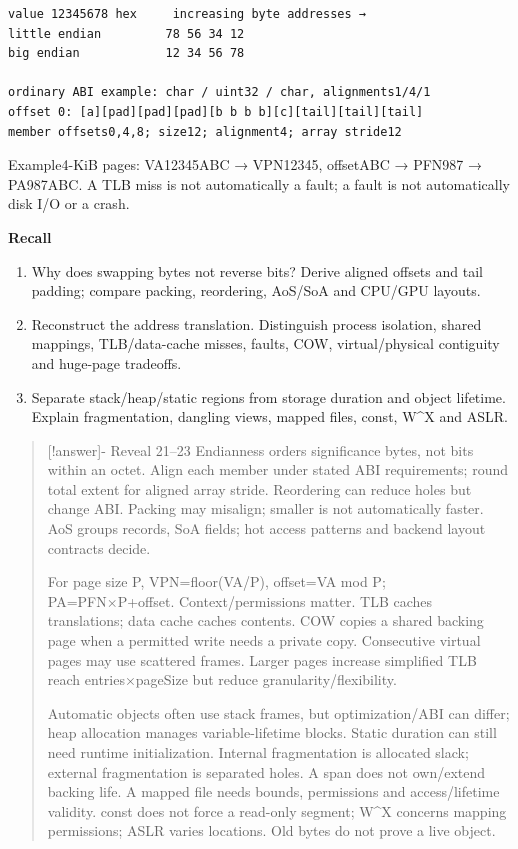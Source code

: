 \begin{verbatim}
value 12345678 hex     increasing byte addresses →
little endian         78 56 34 12
big endian            12 34 56 78

ordinary ABI example: char / uint32 / char, alignments1/4/1
offset 0: [a][pad][pad][pad][b b b b][c][tail][tail][tail]
member offsets0,4,8; size12; alignment4; array stride12
\end{verbatim}


Example4-KiB pages: VA12345ABC → VPN12345, offsetABC → PFN987 → PA987ABC. A TLB miss is not automatically a fault; a fault is not automatically disk I/O or a crash.


\textbf{Recall}

\begin{enumerate}
\def\labelenumi{\arabic{enumi}.}
\setcounter{enumi}{20}
\tightlist
\item
  Why does swapping bytes not reverse bits? Derive aligned offsets and tail padding; compare packing, reordering, AoS/SoA and CPU/GPU layouts.
\item
  Reconstruct the address translation. Distinguish process isolation, shared mappings, TLB/data-cache misses, faults, COW, virtual/physical contiguity and huge-page tradeoffs.
\item
  Separate stack/heap/static regions from storage duration and object lifetime. Explain fragmentation, dangling views, mapped files, const, W\^{}X and ASLR.
\end{enumerate}

\begin{quote}
{[}!answer{]}- Reveal 21--23 Endianness orders significance bytes, not bits within an octet. Align each member under stated ABI requirements; round total extent for aligned array stride. Reordering can reduce holes but change ABI. Packing may misalign; smaller is not automatically faster. AoS groups records, SoA fields; hot access patterns and backend layout contracts decide.

For page size P, VPN=floor(VA/P), offset=VA mod P; PA=PFN×P+offset. Context/permissions matter. TLB caches translations; data cache caches contents. COW copies a shared backing page when a permitted write needs a private copy. Consecutive virtual pages may use scattered frames. Larger pages increase simplified TLB reach entries×pageSize but reduce granularity/flexibility.

Automatic objects often use stack frames, but optimization/ABI can differ; heap allocation manages variable-lifetime blocks. Static duration can still need runtime initialization. Internal fragmentation is allocated slack; external fragmentation is separated holes. A span does not own/extend backing life. A mapped file needs bounds, permissions and access/lifetime validity. const does not force a read-only segment; W\^{}X concerns mapping permissions; ASLR varies locations. Old bytes do not prove a live object.
\end{quote}

